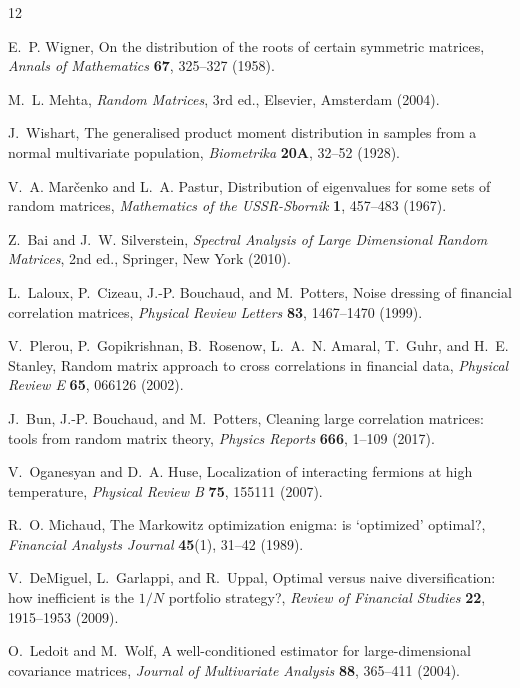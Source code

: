 \documentclass[11pt]{article}
\begin{document}
\begin{thebibliography}{12}

E.~P. Wigner,
On the distribution of the roots of certain symmetric matrices,
\emph{Annals of Mathematics} \textbf{67}, 325--327 (1958).

M.~L. Mehta,
\emph{Random Matrices}, 3rd ed., Elsevier, Amsterdam (2004).

J.~Wishart,
The generalised product moment distribution in samples from a normal
multivariate population,
\emph{Biometrika} \textbf{20A}, 32--52 (1928).

V.~A. Mar\v{c}enko and L.~A. Pastur,
Distribution of eigenvalues for some sets of random matrices,
\emph{Mathematics of the USSR-Sbornik} \textbf{1}, 457--483 (1967).

Z.~Bai and J.~W. Silverstein,
\emph{Spectral Analysis of Large Dimensional Random Matrices}, 2nd ed.,
Springer, New York (2010).

L.~Laloux, P.~Cizeau, J.-P. Bouchaud, and M.~Potters,
Noise dressing of financial correlation matrices,
\emph{Physical Review Letters} \textbf{83}, 1467--1470 (1999).

V.~Plerou, P.~Gopikrishnan, B.~Rosenow, L.~A.~N. Amaral, T.~Guhr, and
H.~E. Stanley,
Random matrix approach to cross correlations in financial data,
\emph{Physical Review E} \textbf{65}, 066126 (2002).

J.~Bun, J.-P. Bouchaud, and M.~Potters,
Cleaning large correlation matrices: tools from random matrix theory,
\emph{Physics Reports} \textbf{666}, 1--109 (2017).

V.~Oganesyan and D.~A. Huse,
Localization of interacting fermions at high temperature,
\emph{Physical Review B} \textbf{75}, 155111 (2007).

R.~O. Michaud,
The Markowitz optimization enigma: is `optimized' optimal?,
\emph{Financial Analysts Journal} \textbf{45}(1), 31--42 (1989).

V.~DeMiguel, L.~Garlappi, and R.~Uppal,
Optimal versus naive diversification: how inefficient is the $1/N$
portfolio strategy?,
\emph{Review of Financial Studies} \textbf{22}, 1915--1953 (2009).

O.~Ledoit and M.~Wolf,
A well-conditioned estimator for large-dimensional covariance matrices,
\emph{Journal of Multivariate Analysis} \textbf{88}, 365--411 (2004).

\end{thebibliography}
\end{document}
